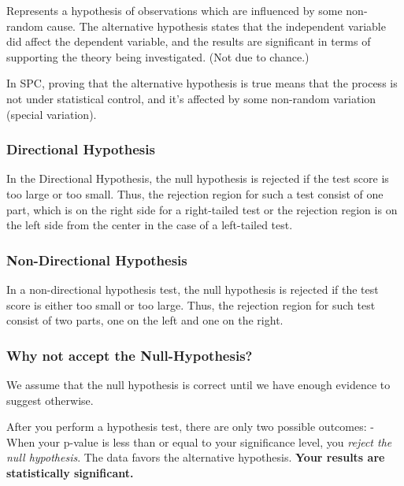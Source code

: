 \documentclass[11pt]{article}
\begin{document}
Represents a hypothesis of observations which are influenced by some
non-random cause. The alternative hypothesis states that the independent
variable did affect the dependent variable, and the results are
significant in terms of supporting the theory being investigated. (Not
due to chance.)

In SPC, proving that the alternative hypothesis is true means that the
process is not under statistical control, and it's affected by some
non-random variation (special variation).

\hypertarget{directional-hypothesis}{%
\subsubsection{Directional Hypothesis}\label{directional-hypothesis}}

In the Directional Hypothesis, the null hypothesis is rejected if the
test score is too large or too small. Thus, the rejection region for
such a test consist of one part, which is on the right side for a
right-tailed test or the rejection region is on the left side from the
center in the case of a left-tailed test.

\hypertarget{non-directional-hypothesis}{%
\subsubsection{Non-Directional
Hypothesis}\label{non-directional-hypothesis}}

In a non-directional hypothesis test, the null hypothesis is rejected if
the test score is either too small or too large. Thus, the rejection
region for such test consist of two parts, one on the left and one on
the right.

\hypertarget{why-not-accept-the-null-hypothesis}{%
\subsubsection{Why not accept the
Null-Hypothesis?}\label{why-not-accept-the-null-hypothesis}}

We assume that the null hypothesis is correct until we have enough
evidence to suggest otherwise.

After you perform a hypothesis test, there are only two possible
outcomes: - When your p-value is less than or equal to your significance
level, you \emph{reject the null hypothesis}. The data favors the
alternative hypothesis. \textbf{Your results are statistically
significant.}
\end{document}
